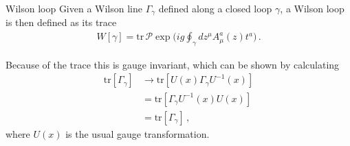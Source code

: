 \medskip
\begin{mydef}{Wilson loop}{}
Given a Wilson line $\Gamma_{\gamma}$ defined along a closed loop $\gamma$, a Wilson loop is then defined as its trace
\begin{align}
    W[\gamma]=\text{tr}\,\mathcal{P}\exp\Big(ig\oint_{\gamma} dz^{\mu}A_{\mu}^{a}(z)t^{a}\Big)\,.\nonumber
\end{align}
\end{mydef}\noindent
Because of the trace this is gauge invariant, which can be shown by calculating
\begin{align}
    \text{tr}[\Gamma_{\gamma}]&\rightarrow \text{tr}[U(x)\Gamma_{\gamma}U^{-1}(x)]\nonumber
    \\
    &=\text{tr}[\Gamma_{\gamma}U^{-1}(x)U(x)]\nonumber
    \\
    &=\text{tr}[\Gamma_{\gamma}]\,,
\end{align}
where $U(x)$ is the usual gauge transformation.

